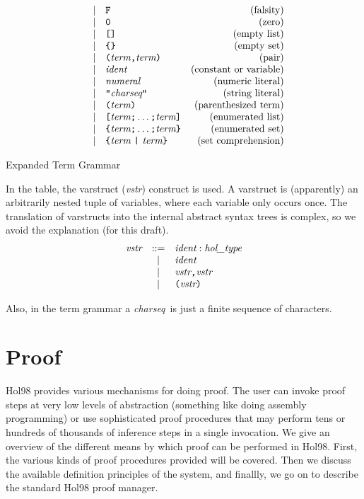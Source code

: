 \documentclass[12pt,fleqn,layout,a4paper]{report}
\newcommand{\ident}      {\mbox{\it ident}}
\newcommand{\numeral}    {\mbox{\it numeral}}
\newcommand{\charseq}    {\mbox{\it charseq}}
\newcommand{\vstr}       {\mbox{\it vstr}}
\newcommand{\type}       {\mbox{\it hol\_type}}
\newcommand{\term}       {\mbox{\it term}}
\begin{document}
\begin{table}
\[\begin{array}{rclr}
  & | & \verb+F+ & \mbox{(falsity)} \\
  & | & \verb+0+ & \mbox{(zero)} \\
  & | & \verb+[]+ & \mbox{(empty list)} \\
  & | & \verb+{}+ & \mbox{(empty set)} \\
  & | & \verb+(+ \term \verb+,+ \term \verb+)+ & \mbox{(pair)} \\
  & | & \ident & \mbox{(constant or variable)} \\
  & | & \numeral & \mbox{(numeric literal)} \\
  & | & \verb+"+\charseq \verb+"+& \mbox{(string literal)} \\
  & | & \verb+(+ \term \verb+)+ & \mbox{(parenthesized term)} \\
  & | & \verb+[+ \term \verb+;+ \ldots \verb+;+ \term \verb+]+ &
 \mbox{(enumerated list)} \\
  & | & \verb+{+ \term \verb+;+ \ldots \verb+;+ \term \verb+}+ &
 \mbox{(enumerated set)} \\
  & | & \verb+{+ \term \ \verb+|+\  \term \verb+}+ & \mbox{(set comprehension)}
 \end{array}
 \]
 \caption{Expanded Term Grammar} \label{expanded-grammar}
 \end{table}

 In the table, the varstruct ({\it vstr\/}) construct is used. A
 varstruct is (apparently) an arbitrarily nested tuple of variables, where
 each variable only occurs once. The translation of varstructs into the
 internal abstract syntax trees is complex, so we avoid
 the explanation (for this draft).
 \[
 \begin{array}{rcl}
  \vstr & ::= & \ident : \type \\
  & | & \ident  \\
  & | & \vstr \verb+,+ \vstr \\
  & | & \verb+(+ \vstr \verb+)+
 \end{array}
 \]

\noindent Also, in the term grammar a \charseq\ is just a finite sequence of
 characters.


\chapter{Proof}

 Hol98 provides various mechanisms for doing proof. The user can invoke
 proof steps at very low levels of abstraction (something like doing
 assembly programming) or use sophisticated proof procedures that may
 perform tens or hundreds of thousands of inference steps in a single
 invocation. We give an overview of the different means by which proof
 can be performed in Hol98. First, the various kinds of proof procedures
 provided will be covered. Then we discuss the available definition
 principles of the system, and finallly, we go on to describe the
 standard Hol98 proof manager.
\end{document}
